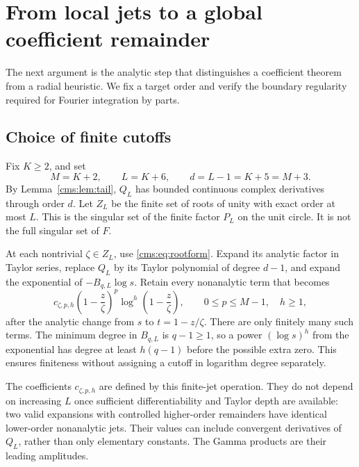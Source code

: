 \section{From local jets to a global coefficient remainder}\label{cms:sec:global}
The next argument is the analytic step that distinguishes a coefficient theorem from a radial heuristic. We fix a target order and verify the boundary regularity required for Fourier integration by parts.

\subsection{Choice of finite cutoffs}
Fix $K\geq2$, and set
\begin{equation}\label{cms:eq:cutoffs}
M=K+2,\qquad L=K+6,\qquad d=L-1=K+5=M+3.
\end{equation}
By Lemma~\ref{cms:lem:tail}, $Q_L$ has bounded continuous complex derivatives through order $d$. Let $Z_L$ be the finite set of roots of unity with exact order at most $L$. This is the singular set of the finite factor $P_L$ on the unit circle. It is not the full singular set of $F$.

At each nontrivial $\zeta\in Z_L$, use \eqref{cms:eq:rootform}. Expand its analytic factor in Taylor series, replace $Q_L$ by its Taylor polynomial of degree $d-1$, and expand the exponential of $-B_{q,L}\log s$. Retain every nonanalytic term that becomes
\begin{equation}\label{cms:eq:jetmonomial}
 c_{\zeta,p,h}\left(1-\frac z\zeta\right)^p
 \log^h\left(1-\frac z\zeta\right),\qquad
 0\leq p\leq M-1,\quad h\geq1,
\end{equation}
after the analytic change from $s$ to $t=1-z/\zeta$. There are only finitely many such terms. The minimum degree in $B_{q,L}$ is $q-1\geq1$, so a power $(\log s)^h$ from the exponential has degree at least $h(q-1)$ before the possible extra zero. This ensures finiteness without assigning a cutoff in logarithm degree separately.

The coefficients $c_{\zeta,p,h}$ are defined by this finite-jet operation. They do not depend on increasing $L$ once sufficient differentiability and Taylor depth are available: two valid expansions with controlled higher-order remainders have identical lower-order nonanalytic jets. Their values can include convergent derivatives of $Q_L$, rather than only elementary constants. The Gamma products are their leading amplitudes.

